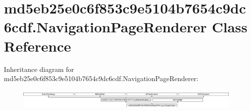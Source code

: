 \hypertarget{classmd5eb25e0c6f853c9e5104b7654c9dc6cdf_1_1NavigationPageRenderer}{}\section{md5eb25e0c6f853c9e5104b7654c9dc6cdf.\+Navigation\+Page\+Renderer Class Reference}
\label{classmd5eb25e0c6f853c9e5104b7654c9dc6cdf_1_1NavigationPageRenderer}
Inheritance diagram for md5eb25e0c6f853c9e5104b7654c9dc6cdf.\+Navigation\+Page\+Renderer\+:\begin{figure}[H]
\begin{center}
\leavevmode
\includegraphics[height=1.029412cm]{classmd5eb25e0c6f853c9e5104b7654c9dc6cdf_1_1NavigationPageRenderer}
\end{center}
\end{figure}
